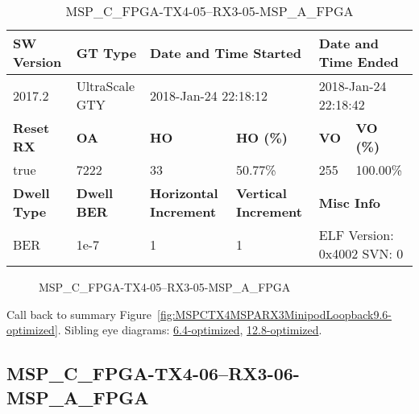\begin{table}[h]
\centering
\caption{MSP\_C\_FPGA-TX4-05--RX3-05-MSP\_A\_FPGA}
\label{tab:MSPCFPGATX405RX305MSPAFPGA9.6-optimized}
\begin{tabular}{@{}|l|l|l|l|l|l|@{}}
\toprule
\textbf{SW Version}                & \textbf{GT Type}   & \multicolumn{2}{l|}{\textbf{Date and Time Started}}            & \multicolumn{2}{l|}{\textbf{Date and Time Ended}}        \\ \midrule
2017.2                       & UltraScale GTY          & \multicolumn{2}{l|}{2018-Jan-24 22:18:12}                   & \multicolumn{2}{l|}{2018-Jan-24 22:18:42}               \\ \midrule
\textbf{Reset RX}                  & \textbf{OA} & \textbf{HO}   & \textbf{HO (\%)} & \textbf{VO} & \textbf{VO (\%)} \\ \midrule
true & 7222        & 33          & 50.77\%        & 255        & 100.00\%       \\ \midrule
\textbf{Dwell Type}                & \textbf{Dwell BER} & \textbf{Horizontal Increment} & \textbf{Vertical Increment}    & \multicolumn{2}{l|}{\textbf{Misc Info}}                  \\ \midrule
BER                            & 1e-7        & 1        & 1           & \multicolumn{2}{l|}{ELF Version: 0x4002 SVN: 0}                         \\ \bottomrule
\end{tabular}
\end{table}

\begin{figure}[h]
\caption{MSP\_C\_FPGA-TX4-05--RX3-05-MSP\_A\_FPGA} \label{fig:MSPCFPGATX405RX305MSPAFPGA9.6-optimized}
\end{figure}

Call back to summary Figure~\ref{fig:MSPCTX4MSPARX3MinipodLoopback9.6-optimized}.
Sibling eye diagrams: \hyperref[sec:MSPCFPGATX405RX305MSPAFPGA6.4-optimized]{6.4-optimized}, \hyperref[sec:MSPCFPGATX405RX305MSPAFPGA12.8-optimized]{12.8-optimized}.

\clearpage
\newpage


\subsection{MSP\_C\_FPGA-TX4-06--RX3-06-MSP\_A\_FPGA}\label{sec:MSPCFPGATX406RX306MSPAFPGA9.6-optimized}

